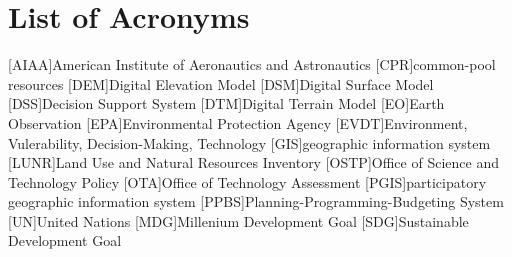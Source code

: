 \tableofcontents
\newpage
\listoffigures
\newpage
\listoftables
\newpage
\chapter*{List of Acronyms}

\begin{acronym}[HyperLEAVES] \itemsep0pt \setlength{\parskip}{0pt}
[AIAA]{American Institute of Aeronautics and Astronautics}
[CPR]{common-pool resources}
[DEM]{Digital Elevation Model}
[DSM]{Digital Surface Model}
[DSS]{Decision Support System}
[DTM]{Digital Terrain Model}
[EO]{Earth Observation}
[EPA]{Environmental Protection Agency}
[EVDT]{Environment, Vulerability, Decision-Making, Technology}
[GIS]{geographic information system}
[LUNR]{Land Use and Natural Resources Inventory}
[OSTP]{Office of Science and Technology Policy}
[OTA]{Office of Technology Assessment}
[PGIS]{participatory geographic information system}
[PPBS]{Planning-Programming-Budgeting System}
[UN]{United Nations}
[MDG]{Millenium Development Goal}
[SDG]{Sustainable Development Goal}
\end{acronym}

